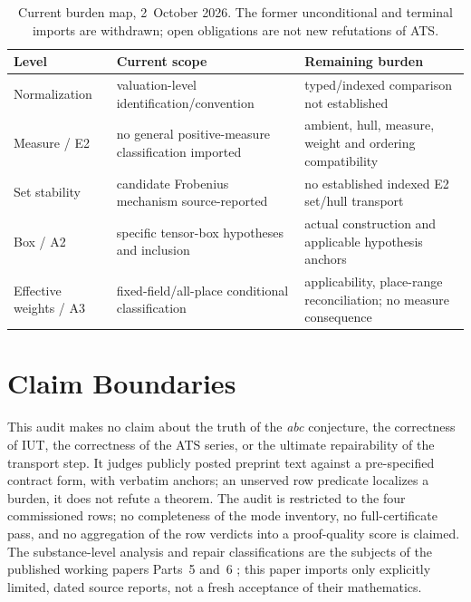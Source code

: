 \documentclass[11pt,a4paper]{article}
\begin{document}
\begin{table}[htbp]
\centering\footnotesize
\begin{tabularx}{\textwidth}{@{}l >{\raggedright\arraybackslash}X >{\raggedright\arraybackslash}X@{}}
\toprule
Level & Current scope & Remaining burden \\
\midrule
Normalization & valuation-level identification/convention & typed/indexed comparison not established \\
Measure / E2 & no general positive-measure classification imported & ambient, hull, measure, weight and ordering compatibility \\
Set stability & candidate Frobenius mechanism source-reported & no established indexed E2 set/hull transport \\
Box / A2 & specific tensor-box hypotheses and inclusion & actual construction and applicable hypothesis anchors \\
Effective weights / A3 & fixed-field/all-place conditional classification & applicability, place-range reconciliation; no measure consequence \\
\bottomrule
\end{tabularx}
\caption{Current burden map, 2~October 2026. The former
unconditional and terminal imports are withdrawn; open obligations
are not new refutations of ATS.}
\label{tab:burden}
\end{table}

\clearpage
\section{Claim Boundaries}\label{sec:claims}

This audit makes no claim about the truth of the \emph{abc} conjecture, the
correctness of IUT, the correctness of the ATS series, or the ultimate
repairability of the transport step. It judges publicly posted preprint text
against a pre-specified contract form, with verbatim anchors; an unserved row
predicate localizes a burden, it does not refute a theorem. The audit is
restricted to the four commissioned rows; no completeness of the mode
inventory, no full-certificate pass, and no aggregation of the row verdicts
into a proof-quality score is claimed. The substance-level analysis and repair classifications are the
subjects of the published working papers Parts~5 and~6
\cite{part5,part6}; this paper imports only explicitly limited,
dated source reports, not a fresh acceptance of their mathematics.
\end{document}
